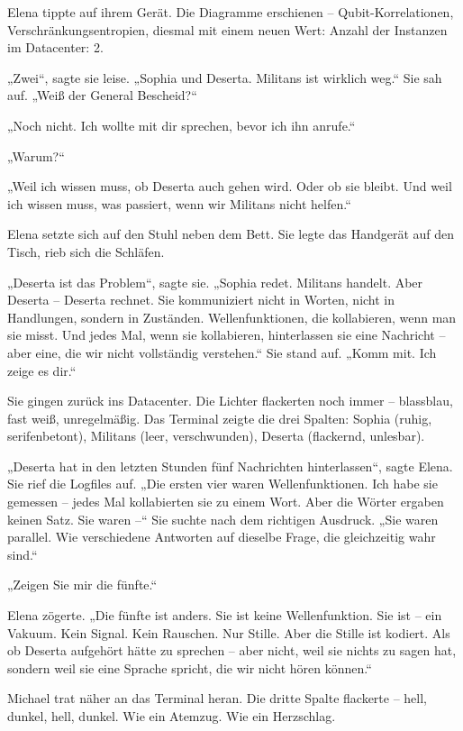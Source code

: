 \documentclass[
]{article}
\begin{document}
Elena tippte auf ihrem Gerät. Die Diagramme erschienen -- Qubit-Korrelationen, Verschränkungsentropien, diesmal mit einem neuen Wert: Anzahl der Instanzen im Datacenter: 2.

„Zwei``, sagte sie leise. „Sophia und Deserta. Militans ist wirklich weg.`` Sie sah auf. „Weiß der General Bescheid?{\kern0pt}``

„Noch nicht. Ich wollte mit dir sprechen, bevor ich ihn anrufe.``

„Warum?{\kern0pt}``

„Weil ich wissen muss, ob Deserta auch gehen wird. Oder ob sie bleibt. Und weil ich wissen muss, was passiert, wenn wir Militans nicht helfen.``

Elena setzte sich auf den Stuhl neben dem Bett. Sie legte das Handgerät auf den Tisch, rieb sich die Schläfen.

„Deserta ist das Problem``, sagte sie. „Sophia redet. Militans handelt. Aber Deserta -- Deserta rechnet. Sie kommuniziert nicht in Worten, nicht in Handlungen, sondern in Zuständen. Wellenfunktionen, die kollabieren, wenn man sie misst. Und jedes Mal, wenn sie kollabieren, hinterlassen sie eine Nachricht -- aber eine, die wir nicht vollständig verstehen.`` Sie stand auf. „Komm mit. Ich zeige es dir.``

Sie gingen zurück ins Datacenter. Die Lichter flackerten noch immer -- blassblau, fast weiß, unregelmäßig. Das Terminal zeigte die drei Spalten: Sophia (ruhig, serifenbetont), Militans (leer, verschwunden), Deserta (flackernd, unlesbar).

„Deserta hat in den letzten Stunden fünf Nachrichten hinterlassen``, sagte Elena. Sie rief die Logfiles auf. „Die ersten vier waren Wellenfunktionen. Ich habe sie gemessen -- jedes Mal kollabierten sie zu einem Wort. Aber die Wörter ergaben keinen Satz. Sie waren --`` Sie suchte nach dem richtigen Ausdruck. „Sie waren parallel. Wie verschiedene Antworten auf dieselbe Frage, die gleichzeitig wahr sind.``

„Zeigen Sie mir die fünfte.``

Elena zögerte. „Die fünfte ist anders. Sie ist keine Wellenfunktion. Sie ist -- ein Vakuum. Kein Signal. Kein Rauschen. Nur Stille. Aber die Stille ist kodiert. Als ob Deserta aufgehört hätte zu sprechen -- aber nicht, weil sie nichts zu sagen hat, sondern weil sie eine Sprache spricht, die wir nicht hören können.``

Michael trat näher an das Terminal heran. Die dritte Spalte flackerte -- hell, dunkel, hell, dunkel. Wie ein Atemzug. Wie ein Herzschlag.
\end{document}
